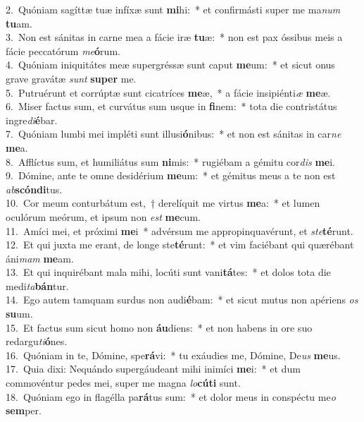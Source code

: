 {2.~}Quóniam sagíttæ tuæ infíxæ sunt \textbf{mi}hi:~* et confirmásti super me ma\textit{num} \textbf{tu}am.\\
{3.~}Non est sánitas in carne mea a fácie iræ \textbf{tu}æ:~* non est pax óssibus meis a fácie peccatórum \textit{me}\textbf{ó}rum.\\
{4.~}Quóniam iniquitátes meæ supergréssæ sunt caput \textbf{me}um:~* et sicut onus grave gravátæ \textit{sunt} \textbf{su}\textbf{per} me.\\
{5.~}Putruérunt et corrúptæ sunt cicatríces \textbf{me}æ,~* a fácie insipiénti\textit{æ} \textbf{me}æ.\\
{6.~}Miser factus sum, et curvátus sum usque in \textbf{fi}nem:~* tota die contristátus ingre\textit{di}\textbf{é}bar.\\
{7.~}Quóniam lumbi mei impléti sunt illusi\textbf{ó}nibus:~* et non est sánitas in car\textit{ne} \textbf{me}a.\\
{8.~}Afflíctus sum, et humiliátus sum \textbf{ni}mis:~* rugiébam a gémitu cor\textit{dis} \textbf{me}i.\\
{9.~}Dómine, ante te omne desidérium \textbf{me}um:~* et gémitus meus a te non est \textit{ab}\textbf{scón}\textbf{di}tus.\\
{10.~}Cor meum conturbátum est,~† derelíquit me virtus \textbf{me}a:~* et lumen oculórum meórum, et ipsum non \textit{est} \textbf{me}cum.\\
{11.~}Amíci mei, et próximi \textbf{me}i~* advérsum me appropinquavérunt, et \textit{ste}\textbf{té}runt.\\
{12.~}Et qui juxta me erant, de longe ste\textbf{té}runt:~* et vim faciébant qui quærébant áni\textit{mam} \textbf{me}am.\\
{13.~}Et qui inquirébant mala mihi, locúti sunt vani\textbf{tá}tes:~* et dolos tota die medi\textit{ta}\textbf{bán}tur.\\
{14.~}Ego autem tamquam surdus non audi\textbf{é}bam:~* et sicut mutus non apériens \textit{os} \textbf{su}um.\\
{15.~}Et factus sum sicut homo non \textbf{áu}diens:~* et non habens in ore suo redargu\textit{ti}\textbf{ó}nes.\\
{16.~}Quóniam in te, Dómine, spe\textbf{rá}vi:~* tu exáudies me, Dómine, De\textit{us} \textbf{me}us.\\
{17.~}Quia dixi: Nequándo supergáudeant mihi inimíci \textbf{me}i:~* et dum commovéntur pedes mei, super me magna \textit{lo}\textbf{cú}\textbf{ti} sunt.\\
{18.~}Quóniam ego in flagélla pa\textbf{rá}tus sum:~* et dolor meus in conspéctu me\textit{o} \textbf{sem}per.\\
